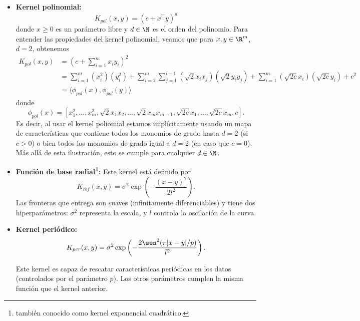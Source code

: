 \begin{itemize}
    \item   \textbf{Kernel polinomial:}
    \begin{equation}
       K_{pol} (x, y) = (c + x^\top y)^d
    \end{equation}
    donde $x\geq 0$ es un parámetro libre y $d\in\N$ es el orden del polinomio. Para entender las propiedades del kernel polinomial, veamos que para $x,y\in\R^m$, $d=2$, obtenemos 
    \begin{align}
        K_{pol} (x, y)  &= \left(c + \sum_{i=1}^m x_iy_i\right)^2\\
                        &= \sum_{i=1}^m (x_i^2)(y_i^2) + \sum_{i=2}^m \sum_{j=1}^{i-1} (\sqrt{2}x_ix_j)(\sqrt{2}y_iy_j) + \sum_{i=1}^m (\sqrt{2c}x_i)(\sqrt{2c}y_i) + c^2\\
                        &=\langle \phi_{pol}(x) , \phi_{pol}(y) \rangle
    \end{align}
    donde 
    \begin{equation}
        \phi_{pol}(x) = [x_1^2,\ldots,x_m^2,\sqrt{2}x_1x_2,\ldots, \sqrt{2}x_{m}x_{m-1},\sqrt{2c}x_1,\ldots,\sqrt{2c}x_m,c].
    \end{equation}
    Es decir, al usar el kernel poliomial estamos implícitamente usando un mapa de características que contiene todos los monomios de grado hasta $d=2$ (si $c>0$) o bien todos los monomios de grado igual a $d=2$ (en caso que $c=0$). Más allá de esta ilustración, esto se cumple para cualquier $d\in\N$.
    \item \textbf{Función de base radial\footnote{también conocido como kernel exponencial cuadrático.}:} Este kernel está definido por
    \begin{equation}
        K_{rbf} (x , y ) = \sigma^2 \exp\left(-\frac{(x -y)^2}{2l^2}\right).
    \end{equation}
    Las fronteras que entrega son suaves (infinitamente diferenciables) y tiene dos hiperparámetros: $\sigma^2$ representa la escala, y $l$ controla la oscilación de la curva. 
    
    \item \textbf{Kernel periódico:}
    \begin{equation}
       K_{per} (x , y) = \sigma^2 \exp\left(- \frac{2\sen^2 (\pi|x -y|/p)}{l^2}\right).
    \end{equation}
    
    Este kernel es capaz de rescatar características periódicas en los datos (controlados por el parámetro $p$). Los otros parámetros cumplen la misma función que el kernel anterior. 

    
\end{itemize}

